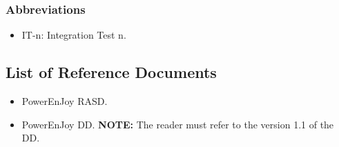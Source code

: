 \subsubsection{Abbreviations}
\begin{itemize}
\item IT-n: Integration Test n.
\end{itemize}



\subsection{List of Reference Documents}
\begin{itemize}
	\item PowerEnJoy RASD.	
	\item PowerEnJoy DD.
	\textbf{NOTE:} The reader must refer to the version 1.1 of the DD.
\end{itemize}

